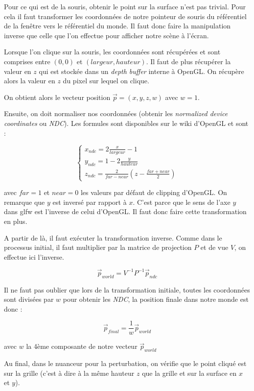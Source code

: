 \documentclass[a4paper,11pt,leqno]{article}
\begin{document}
Pour ce qui est de la souris, obtenir le point sur la surface n'est pas trivial. Pour cela il faut transformer les coordonnées de notre pointeur de souris du référentiel de la fenêtre vers le référentiel du monde. Il faut donc faire la manipulation inverse que celle que l'on effectue pour afficher notre scène à l'écran.

Lorsque l'on clique sur la souris, les coordonnées sont récupérées et sont comprises entre $(0, 0)$ et $(largeur, hauteur)$. Il faut de plus récupérer la valeur en $z$ qui est stockée dans un \emph{depth buffer} interne à OpenGL. On récupère alors la valeur en $z$ du pixel sur lequel on clique.

On obtient alors le vecteur position $\overrightarrow{p} = (x,y,z,w)$ avec $w=1$.

Ensuite, on doit normaliser nos coordonnées (obtenir les \emph{normalized device coordinates} ou \emph{NDC}). Les formules sont disponibles sur le wiki d'OpenGL et sont :

\[
\begin{cases}
	x_{ndc} = 2\frac{x}{largeur} - 1\\
	y_{ndc} = 1 - 2 \frac{y}{hauteur}\\
	z_{ndc} = \frac{2}{far - near}( z - \frac{far + near}{2})
\end{cases}
\]

avec $far = 1$ et $near = 0$ les valeurs par défaut de clipping d'OpenGL. On remarque que $y$ est inversé par rapport à $x$. C'est parce que le sens de l'axe $y$ dans glfw est l'inverse de celui d'OpenGL. Il faut donc faire cette transformation en plus.

A partir de là, il faut exécuter la transformation inverse. Comme dans le processus initial, il faut multiplier par la matrice de projection $P$ et de vue $V$, on effectue ici l'inverse.

\[
	\overrightarrow{p}_{world} = V^{-1}P^{-1} \overrightarrow{p}_{ndc}
\]

Il ne faut pas oublier que lors de la transformation initiale, toutes les coordonnées sont divisées par $w$ pour obtenir les \emph{NDC}, la position finale dans notre monde est donc :

\[
	\overrightarrow{p}_{final} = \frac{1}{w} \overrightarrow{p}_{world}
\]

avec $w$ la 4ème composante de notre vecteur $\overrightarrow{p}_{world}$

Au final, dans le nuanceur pour la perturbation, on vérifie que le point cliqué est sur la grille (c'est à dire à la même hauteur $z$ que la grille et sur la surface en $x$ et $y$).
\end{document}
